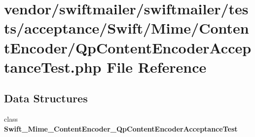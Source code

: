 \section{vendor/swiftmailer/swiftmailer/tests/acceptance/\+Swift/\+Mime/\+Content\+Encoder/\+Qp\+Content\+Encoder\+Acceptance\+Test.php File Reference}
\label{_qp_content_encoder_acceptance_test_8php}
\subsection*{Data Structures}
\begin{DoxyCompactItemize}
\item 
class {\bf Swift\+\_\+\+Mime\+\_\+\+Content\+Encoder\+\_\+\+Qp\+Content\+Encoder\+Acceptance\+Test}
\end{DoxyCompactItemize}
